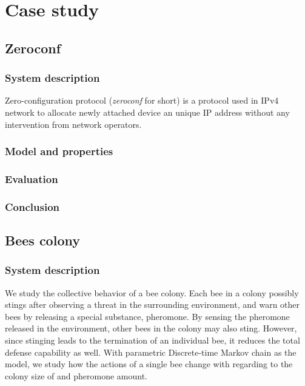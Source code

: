 \chapter{Case study}
\section{Zeroconf}
\subsection{System description}
Zero-configuration protocol (\textit{zeroconf} for short) is a protocol used in IPv4 network to
allocate newly attached device an unique IP address without any intervention from network operators.
\subsection{Model and properties}
\subsection{Evaluation}
\subsection{Conclusion}

\section{Bees colony}
\subsection{System description}
We study the collective behavior of a bee colony. Each bee in a colony possibly stings after
observing a threat in the surrounding environment, and warn other bees by releasing a special
substance, pheromone. By sensing the pheromone released in the environment, other bees in the colony
may also sting. However, since stinging leads to the termination of an individual bee, it reduces
the total defense capability as well. With parametric Discrete-time Markov chain as the model, we
study how the actions of a single bee change with regarding to the colony size of and pheromone
amount.

